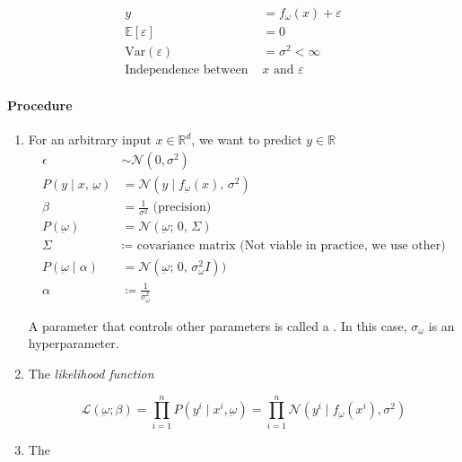 \begin{align*}
  y &= f_\omega(x) + \varepsilon \\
  \mathds{E}[\varepsilon] &= 0 \\
  \text{Var}(\varepsilon) &= \sigma^2 < \infty \\
  \text{Independence between }& x \text{ and }\varepsilon
\end{align*}

\paragraph{Procedure}

\begin{enumerate}
	\item For an arbitrary input \(x \in \mathds{R}^d\), we want to predict
	      \(y \in \mathds{R}\)
	      \begin{align*}
		      \epsilon                      & \sim \mathcal{N}(0, \sigma^2)                                       \\
		      P(y \mid x,\, \underbar{\omega})   & = \mathcal{N}(y \mid f_{\underbar{\omega}}(x),\, \sigma^2)               \\
		      \beta                         & = \frac{1}{\sigma^2} \text{ (precision)}                            \\
		      P(\underbar{\omega})          & = \mathcal{N}(\underbar{\omega} ;\, 0 ,\, \Sigma)                       \\
		      \Sigma                        & \coloneqq \text{ covariance matrix (Not viable in practice, we use other)} \\
		      P(\underbar{\omega} \mid \alpha) & = \mathcal{N}(\underbar{\omega} ;\, 0 ,\,\sigma_{\omega}^2 I))         \\
		      \alpha                        & \coloneqq \frac{1}{\sigma_{\omega}^2}
	      \end{align*}

	      A parameter that controls other parameters is called a
	      . In this case, \(\sigma_\omega\) is an
	      hyperparameter.

	\item The \emph{likelihood function}

	      \[
		      \mathcal{L}(\underbar{\omega} ; \beta) = \prod_{i=1}^n P(y^i \mid x^i, \underbar{\omega}) =
		      \prod_{i=1}^n \mathcal{N}(y^i \mid f_{\underbar{\omega}}(x^i), \sigma^2)
	      \]

	\item The 
\end{enumerate}

